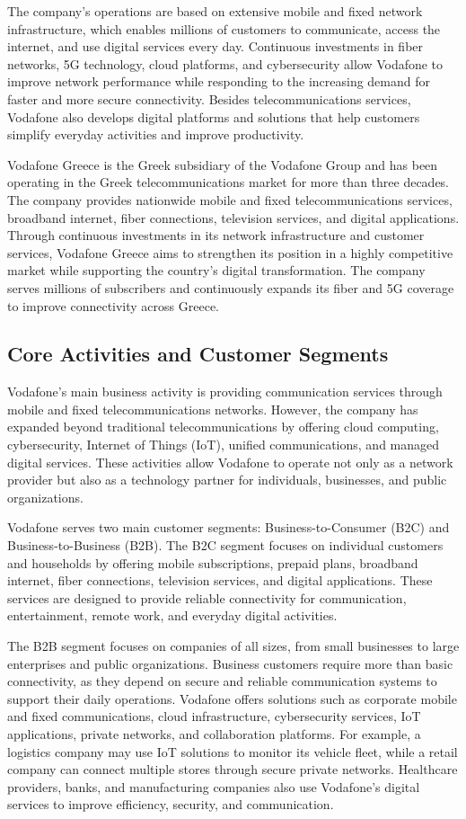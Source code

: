 \documentclass[12pt, a4paper, oneside]{report}
\begin{document}
The company's operations are based on extensive mobile and fixed network infrastructure, which enables millions of customers to communicate, access the internet, and use digital services every day. Continuous investments in fiber networks, 5G technology, cloud platforms, and cybersecurity allow Vodafone to improve network performance while responding to the increasing demand for faster and more secure connectivity. Besides telecommunications services, Vodafone also develops digital platforms and solutions that help customers simplify everyday activities and improve productivity.

Vodafone Greece is the Greek subsidiary of the Vodafone Group and has been operating in the Greek telecommunications market for more than three decades. The company provides nationwide mobile and fixed telecommunications services, broadband internet, fiber connections, television services, and digital applications. Through continuous investments in its network infrastructure and customer services, Vodafone Greece aims to strengthen its position in a highly competitive market while supporting the country's digital transformation. The company serves millions of subscribers and continuously expands its fiber and 5G coverage to improve connectivity across Greece.

\subsection{Core Activities and Customer Segments}
Vodafone's main business activity is providing communication services through mobile and fixed telecommunications networks. However, the company has expanded beyond traditional telecommunications by offering cloud computing, cybersecurity, Internet of Things (IoT), unified communications, and managed digital services. These activities allow Vodafone to operate not only as a network provider but also as a technology partner for individuals, businesses, and public organizations.

Vodafone serves two main customer segments: Business-to-Consumer (B2C) and Business-to-Business (B2B). The B2C segment focuses on individual customers and households by offering mobile subscriptions, prepaid plans, broadband internet, fiber connections, television services, and digital applications. These services are designed to provide reliable connectivity for communication, entertainment, remote work, and everyday digital activities.

The B2B segment focuses on companies of all sizes, from small businesses to large enterprises and public organizations. Business customers require more than basic connectivity, as they depend on secure and reliable communication systems to support their daily operations. Vodafone offers solutions such as corporate mobile and fixed communications, cloud infrastructure, cybersecurity services, IoT applications, private networks, and collaboration platforms. For example, a logistics company may use IoT solutions to monitor its vehicle fleet, while a retail company can connect multiple stores through secure private networks. Healthcare providers, banks, and manufacturing companies also use Vodafone's digital services to improve efficiency, security, and communication.
\end{document}
